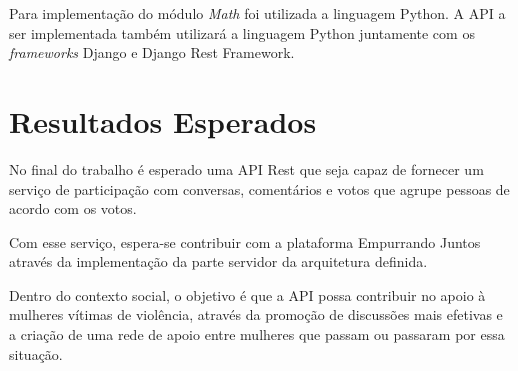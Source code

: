 Para implementação do módulo \textit{Math} foi utilizada a linguagem Python. A API a ser implementada também utilizará a linguagem Python
juntamente com os \textit{frameworks} Django e Django Rest Framework.

\section{Resultados Esperados}

No final do trabalho é esperado uma API Rest que seja capaz de fornecer um serviço de participação com conversas, comentários
e votos que agrupe pessoas de acordo com os votos.

Com esse serviço, espera-se contribuir com a plataforma Empurrando Juntos através da implementação da parte servidor da 
arquitetura definida.

Dentro do contexto social, o objetivo é que a API possa contribuir no apoio à mulheres vítimas de violência, através
da promoção de discussões mais efetivas e a criação de uma rede de apoio entre mulheres que passam ou passaram por essa situação.









